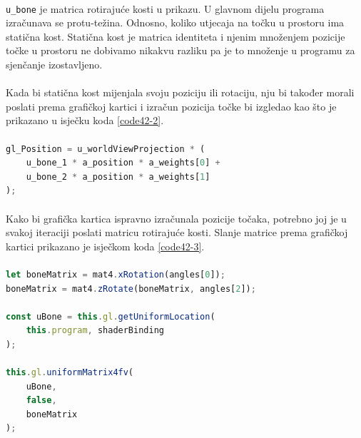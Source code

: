 \documentclass[times, utf8, diplomski]{fer}
\begin{document}
\paragraph{}
\verb#u_bone# je matrica rotirajuće kosti u prikazu. U glavnom dijelu programa izračunava se 
protu-težina. Odnosno, koliko utjecaja na točku u prostoru ima statična kost. Statična kost 
je matrica identiteta i njenim množenjem pozicije točke u prostoru ne dobivamo nikakvu 
razliku pa je to množenje u programu za sjenčanje izostavljeno.

\paragraph{}
Kada bi statična kost mijenjala svoju poziciju ili rotaciju, nju bi također morali poslati 
prema grafičkoj kartici i izračun pozicija točke bi izgledao kao što je prikazano u isječku 
koda \ref{code42-2}.

\paragraph{}
\begin{lstlisting}[language=Javascript,label=code42-2,caption=Prošireno računanje pozicije točke na dvije kosti]
gl_Position = u_worldViewProjection * (
	u_bone_1 * a_position * a_weights[0] +
	u_bone_2 * a_position * a_weights[1]
);
\end{lstlisting}

\paragraph{}
Kako bi grafička kartica ispravno izračunala pozicije točaka, potrebno joj je u svakoj 
iteraciji poslati matricu rotirajuće kosti. Slanje matrice prema grafičkoj kartici prikazano je isječkom koda \ref{code42-3}.

\paragraph{}
\begin{lstlisting}[language=Javascript,label=code42-3,caption=Slanje dodatnih informacija prema grafičkoj kartici]
let boneMatrix = mat4.xRotation(angles[0]);
boneMatrix = mat4.zRotate(boneMatrix, angles[2]);

const uBone = this.gl.getUniformLocation(
	this.program, shaderBinding
);

this.gl.uniformMatrix4fv(
	uBone,
	false,
	boneMatrix
);
\end{lstlisting}
\end{document}
